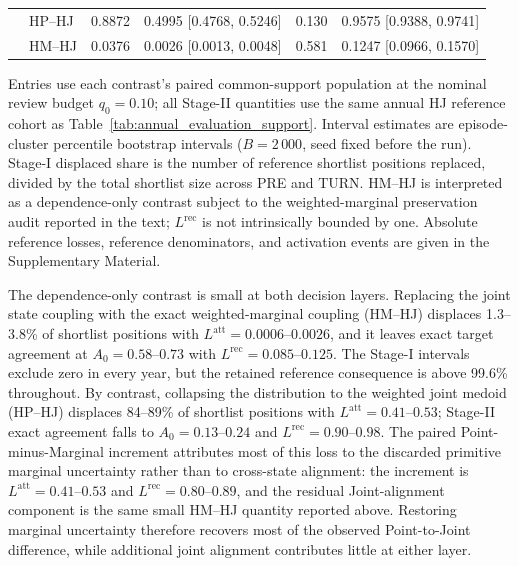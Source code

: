 \begin{table}[pos=t]
\begin{tabular}{llrrrr}
 & HP--HJ & 0.8872 & 0.4995 [0.4768, 0.5246] & 0.130 & 0.9575 [0.9388, 0.9741] \\
 & HM--HJ & 0.0376 & 0.0026 [0.0013, 0.0048] & 0.581 & 0.1247 [0.0966, 0.1570] \\
\bottomrule
\end{tabular}
\par\vspace{3pt}
\begin{minipage}{0.98\linewidth}
\footnotesize
Entries use each contrast's paired common-support population at the nominal review budget $q_0=0.10$; all Stage-II quantities use the same annual HJ reference cohort as Table~\ref{tab:annual_evaluation_support}. Interval estimates are episode-cluster percentile bootstrap intervals ($B=2\,000$, seed fixed before the run). Stage-I displaced share is the number of reference shortlist positions replaced, divided by the total shortlist size across PRE and TURN. HM--HJ is interpreted as a dependence-only contrast subject to the weighted-marginal preservation audit reported in the text; $L^{\mathrm{rec}}$ is not intrinsically bounded by one. Absolute reference losses, reference denominators, and activation events are given in the Supplementary Material.
\end{minipage}
\end{table}

The dependence-only contrast is small at both decision layers. Replacing the joint state coupling with the exact weighted-marginal coupling (HM--HJ) displaces 1.3--3.8\% of shortlist positions with $L^{\mathrm{att}}=0.0006$--$0.0026$, and it leaves exact target agreement at $A_0=0.58$--$0.73$ with $L^{\mathrm{rec}}=0.085$--$0.125$. The Stage-I intervals exclude zero in every year, but the retained reference consequence is above 99.6\% throughout. By contrast, collapsing the distribution to the weighted joint medoid (HP--HJ) displaces 84--89\% of shortlist positions with $L^{\mathrm{att}}=0.41$--$0.53$; Stage-II exact agreement falls to $A_0=0.13$--$0.24$ and $L^{\mathrm{rec}}=0.90$--$0.98$. The paired Point-minus-Marginal increment attributes most of this loss to the discarded primitive marginal uncertainty rather than to cross-state alignment: the increment is $L^{\mathrm{att}}=0.41$--$0.53$ and $L^{\mathrm{rec}}=0.80$--$0.89$, and the residual Joint-alignment component is the same small HM--HJ quantity reported above. Restoring marginal uncertainty therefore recovers most of the observed Point-to-Joint difference, while additional joint alignment contributes little at either layer.

